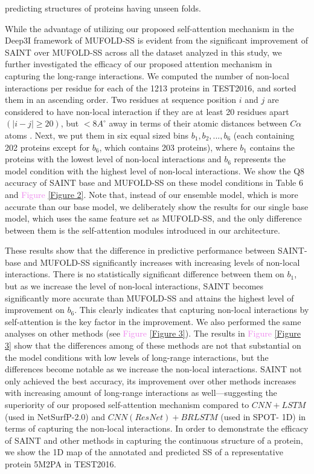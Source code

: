 \documentclass[11 pt, a4paper]{article}
\begin{document}
\begin{multicols}{2}
predicting structures of proteins having unseen folds.\par
While the advantage of utilizing our proposed self-attention
mechanism in the Deep3I framework of MUFOLD-SS is evident
from the significant improvement of SAINT over MUFOLD-SS
across all the dataset analyzed in this study, we further
investigated the efficacy of our proposed attention mechanism
in capturing the long-range interactions. We computed the
number of non-local interactions per residue for each of the
1213 proteins in TEST2016, and sorted them in an ascending 
order. Two residues at sequence position $i$ and $j$ are
considered to have non-local interaction if they
are at least 20 residues apart $(|i - j| \geq 20)$, but 
$<8 A^{\circ}$ away in terms of their atomic distances 
between $C\alpha$ atoms \cite{Heffernan}. Next, we put them
in six equal sized bins $b_1, b_2, ... , b_6$ (each
containing 202 proteins except for $b_6$, which contains 203
proteins), where $b_1$ contains the proteins with the lowest 
level of non-local interactions and $b_6$ represents the
model condition with the highest level of non-local
interactions. We show the Q8 accuracy of SAINT base and
MUFOLD-SS on these model conditions in Table 6 and 
\textcolor{violet}{Figure} \ref{Figure 2}. Note that, instead of our ensemble
model, which is more accurate than our base model, we
deliberately show the results for our single base model, 
which uses the same feature set as MUFOLD-SS, and the only
difference between them is the self-attention modules 
introduced in our architecture.\par
These results show that the difference in predictive
performance between SAINT-base and MUFOLD-SS significantly
increases with increasing levels of non-local interactions.
There is no statistically significant difference between them
on $b_1$, but as we increase the level of non-local
interactions, SAINT becomes significantly more accurate than
MUFOLD-SS and attains the highest level of improvement on 
$b_6$. This clearly indicates that capturing non-local 
interactions by self-attention is the key factor in the
improvement. We also performed the same analyses on other
methods (see \textcolor{violet}{Figure} \ref{Figure 3}). The
results in \textcolor{violet}{Figure} \ref{Figure 3} show 
that the differences among of these methods are not that 
substantial on the model conditions with low levels of 
long-range interactions, but the differences become notable
as we increase the non-local interactions. SAINT not only 
achieved the best accuracy, its improvement over other 
methods increases with increasing amount of long-range 
interactions as well—suggesting the superiority of our 
proposed self-attention mechanism compared to $CNN+LSTM$ 
(used in NetSurfP-2.0) and $CNN(ResNet)+BRLSTM$ (used in SPOT-
1D) in terms of capturing the non-local interactions. In 
order to demonstrate the efficacy of SAINT and other methods 
in capturing the continuous structure of a protein, we show 
the 1D map of the annotated and predicted SS of a
representative protein 5M2PA in TEST2016.


\end{multicols}
\end{document}
